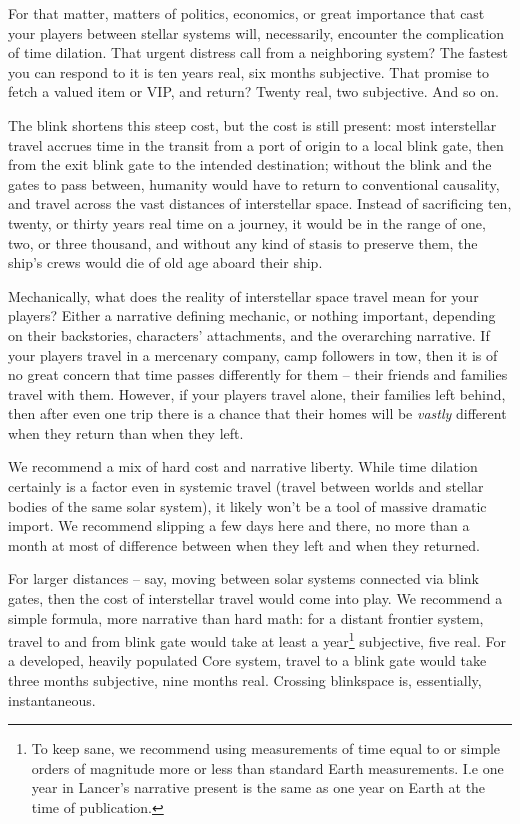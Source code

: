 For that matter, matters of politics, economics, or great importance that cast your players between
stellar systems will, necessarily, encounter the complication of time dilation. That urgent distress
call from a neighboring system? The fastest you can respond to it is ten years real, six months
subjective. That promise to fetch a valued item or VIP, and return? Twenty real, two subjective.
And so on.

The blink shortens this steep cost, but the cost is still present: most interstellar travel accrues time
in the transit from a port of origin to a local blink gate, then from the exit blink gate to the intended
destination; without the blink and the gates to pass between, humanity would have to return to
conventional causality, and travel across the vast distances of interstellar space. Instead of
sacrificing ten, twenty, or thirty years real time on a journey, it would be in the range of one, two,
or three thousand, and without any kind of stasis to preserve them, the ship’s crews would die of
old age aboard their ship.

Mechanically, what does the reality of interstellar space travel mean for your players? Either a
narrative defining mechanic, or nothing important, depending on their backstories, characters’
attachments, and the overarching narrative. If your players travel in a mercenary company, camp
followers in tow, then it is of no great concern that time passes differently for them -- their friends
and families travel with them. However, if your players travel alone, their families left behind, then
after even one trip there is a chance that their homes will be \textit{vastly} different when they return than
when they left.

We recommend a mix of hard cost and narrative liberty. While time dilation certainly is a factor
even in systemic travel (travel between worlds and stellar bodies of the same solar system), it
likely won’t be a tool of massive dramatic import. We recommend slipping a few days here and
there, no more than a month at most of difference between when they left and when they
returned.

For larger distances -- say, moving between solar systems connected via blink gates, then the
cost of interstellar travel would come into play. We recommend a simple formula, more narrative
than hard math: for a distant frontier system, travel to and from blink gate would take at least a
year\footnote{To keep sane, we recommend using measurements of time equal to or simple orders of magnitude more
or less than standard Earth measurements. I.e one year in Lancer’s narrative present is the same as one
year on Earth at the time of publication.} subjective, five real. For a developed, heavily populated Core system, travel to a blink gate
would take three months subjective, nine months real. Crossing blinkspace is, essentially,
instantaneous.

